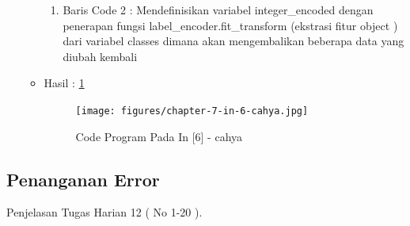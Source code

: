 \begin{enumerate}
\begin{itemize}
\begin{enumerate}
\item Baris Code 2	: Mendefinisikan variabel integer\_encoded dengan penerapan fungsi label\_encoder.fit\_transform (ekstrasi fitur object ) dari variabel classes dimana akan mengembalikan beberapa data yang diubah kembali
\end{enumerate}
\par
\item Hasil : \ref{chapter-7-in-6-cahya}
\par
\par
\begin{figure}[!hbtp]
\centering
\texttt{[image: figures/chapter-7-in-6-cahya.jpg]}
\caption{Code Program Pada In [6] - cahya}
\label{chapter-7-in-6-cahya}
\end{figure}
\par
\par
\end{itemize}
\par
\par
\par
\par
\par
\par
\end{enumerate}


\subsection{Penanganan Error}
Penjelasan Tugas Harian 12 ( No 1-20 ).
\par
\par

